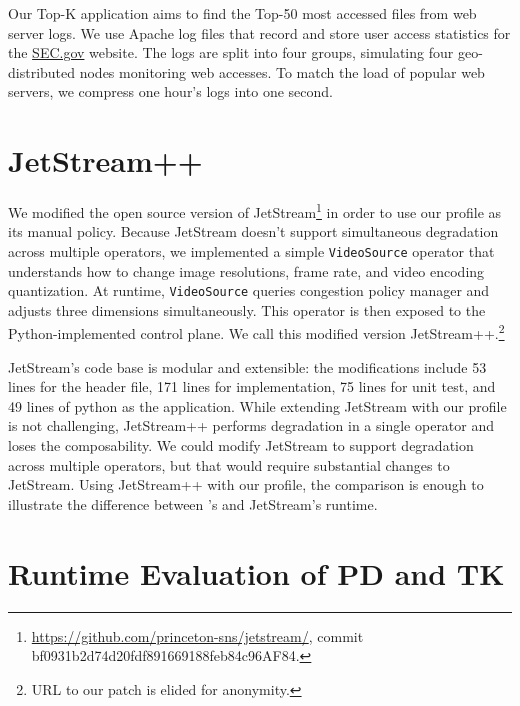 \documentclass[twocolumn]{article}
\begin{document}
Our Top-K application aims to find the Top-50 most accessed files from web
server logs. We use Apache log files that record and store user access
statistics for the \href{https://www.sec.gov}{SEC.gov} website. The logs are
split into four groups, simulating four geo-distributed nodes monitoring web
accesses. To match the load of popular web servers, we compress one hour's logs
into one second.

\section{JetStream++}
\label{appendix:jetstream++}

We modified the open source version of
JetStream\footnote{\url{https://github.com/princeton-sns/jetstream/}, commit
  bf0931b2d74d20fdf891669188feb84c96AF84.} in order to use our profile as its
manual policy. Because JetStream doesn't support simultaneous degradation across
multiple operators, we implemented a simple \texttt{VideoSource} operator that
understands how to change image resolutions, frame rate, and video encoding
quantization. At runtime, \texttt{VideoSource} queries congestion policy manager
and adjusts three dimensions simultaneously. This operator is then exposed to
the Python-implemented control plane. We call this modified version
JetStream++.\footnote{URL to our patch is elided for anonymity.}


JetStream's code base is modular and extensible: the modifications include 53
lines for the header file, 171 lines for implementation, 75 lines for unit test,
and 49 lines of python as the application. While extending JetStream with our
profile is not challenging, JetStream++ performs degradation in a single
operator and loses the composability. We could modify JetStream to support
degradation across multiple operators, but that would require substantial
changes to JetStream. Using JetStream++ with our profile, the comparison is
enough to illustrate the difference between \sysname{}'s and JetStream's
runtime.

\section{Runtime Evaluation of PD and TK}
\label{appendix:more-runtime}
\end{document}
